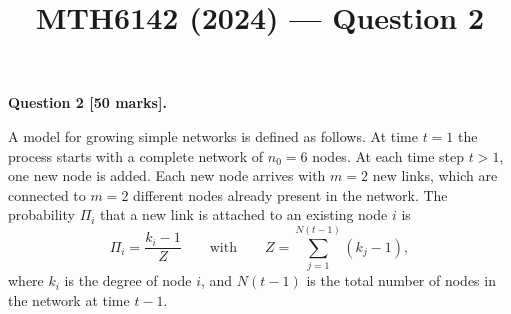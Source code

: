 \documentclass[11pt,a4paper]{article}
\title{MTH6142 (2024) --- Question 2}
\author{}
\date{}
\begin{document}
\maketitle

\noindent\textbf{Question 2 [50 marks].}

A model for growing simple networks is defined as follows. At time $t = 1$ the process starts with a complete network of $n_0 = 6$ nodes. At each time step $t > 1$, one new node is added. Each new node arrives with $m = 2$ new links, which are connected to $m = 2$ different nodes already present in the network. The probability $\Pi_i$ that a new link is attached to an existing node $i$ is
\[
  \Pi_i = \frac{k_i - 1}{Z}
  \qquad\text{with}\qquad
  Z = \sum_{j=1}^{N(t-1)} (k_j - 1),
\]
where $k_i$ is the degree of node $i$, and $N(t-1)$ is the total number of nodes in the network at time $t-1$.
\end{document}
